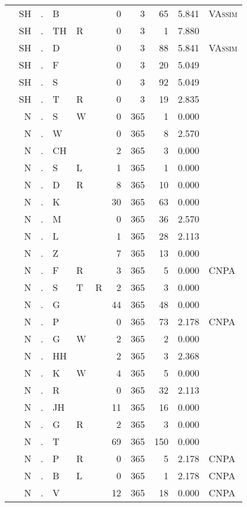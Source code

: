\begin{longtable}{r@{ } r@{ } c@{ } l@{ } l@{ } l@{ } r r r r l }
 & SH & . & B &  &  & 0 & 3 & 65 & 5.841 & \textsc{VAssim} \\
 & SH & . & TH & R &  & 0 & 3 & 1 & 7.880 &  \\
 & SH & . & D &  &  & 0 & 3 & 88 & 5.841 & \textsc{VAssim} \\
 & SH & . & F &  &  & 0 & 3 & 20 & 5.049 &  \\
 & SH & . & S &  &  & 0 & 3 & 92 & 5.049 &  \\
 & SH & . & T & R &  & 0 & 3 & 19 & 2.835 &  \\
 & N & . & S & W &  & 0 & 365 & 1 & 0.000 &  \\
 & N & . & W &  &  & 0 & 365 & 8 & 2.570 &  \\
 & N & . & CH &  &  & 2 & 365 & 3 & 0.000 &  \\
 & N & . & S & L &  & 1 & 365 & 1 & 0.000 &  \\
 & N & . & D & R &  & 8 & 365 & 10 & 0.000 &  \\
 & N & . & K &  &  & 30 & 365 & 63 & 0.000 &  \\
 & N & . & M &  &  & 0 & 365 & 36 & 2.570 &  \\
 & N & . & L &  &  & 1 & 365 & 28 & 2.113 &  \\
 & N & . & Z &  &  & 7 & 365 & 13 & 0.000 &  \\
 & N & . & F & R &  & 3 & 365 & 5 & 0.000 & \textsc{CNPA} \\
 & N & . & S & T & R & 2 & 365 & 3 & 0.000 &  \\
 & N & . & G &  &  & 44 & 365 & 48 & 0.000 &  \\
 & N & . & P &  &  & 0 & 365 & 73 & 2.178 & \textsc{CNPA} \\
 & N & . & G & W &  & 2 & 365 & 2 & 0.000 &  \\
 & N & . & HH &  &  & 2 & 365 & 3 & 2.368 &  \\
 & N & . & K & W &  & 4 & 365 & 5 & 0.000 &  \\
 & N & . & R &  &  & 0 & 365 & 32 & 2.113 &  \\
 & N & . & JH &  &  & 11 & 365 & 16 & 0.000 &  \\
 & N & . & G & R &  & 2 & 365 & 3 & 0.000 &  \\
 & N & . & T &  &  & 69 & 365 & 150 & 0.000 &  \\
 & N & . & P & R &  & 0 & 365 & 5 & 2.178 & \textsc{CNPA} \\
 & N & . & B & L &  & 0 & 365 & 1 & 2.178 & \textsc{CNPA} \\
 & N & . & V &  &  & 12 & 365 & 18 & 0.000 & \textsc{CNPA} \\

\end{longtable}

